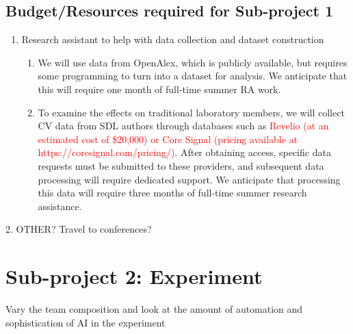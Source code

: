 \documentclass{article}
\begin{document}
\subsection{Budget/Resources required for Sub-project 1}
\begin{enumerate}
    \item Research assistant to help with data collection and dataset construction
    \begin{enumerate}
        \item We will use data from OpenAlex, which is publicly available, but requires some programming to turn into a dataset for analysis. We anticipate that this will require one month of full-time summer RA work.
    \item To examine the effects on traditional laboratory members, we will collect CV data from SDL authors through databases such as \textcolor{red}{Revelio (at an estimated cost of \$20,000) or Core Signal (pricing available at https://coresignal.com/pricing/)}. After obtaining access, specific data requests must be submitted to these providers, and subsequent data processing will require dedicated support. We anticipate that processing this data will require three months of full-time summer research assistance.
    \end{enumerate}
\end{enumerate}
2. OTHER? Travel to conferences?



\section{Sub-project 2: Experiment}








Vary the team composition and look at the amount of automation and sophistication of AI in the experiment
\end{document}
